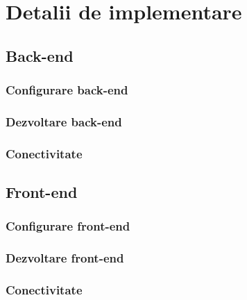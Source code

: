 \chapter{Detalii de implementare}
\label{chapter:implementare}

\section{Back-end}
\label{sec:implementare-backend}

\subsection{Configurare back-end}
\label{subsec:implementare-backend}

\subsection{Dezvoltare back-end}
\label{subsec:implementare-backend}

\subsection{Conectivitate}
\label{subsec:implementare-backend}

\section{Front-end}
\label{sec:implementare-frontend}

\subsection{Configurare front-end}
\label{subsec:implementare-frontend}

\subsection{Dezvoltare front-end}
\label{subsec:implementare-frontend}

\subsection{Conectivitate}
\label{subsec:implementare-frontend}